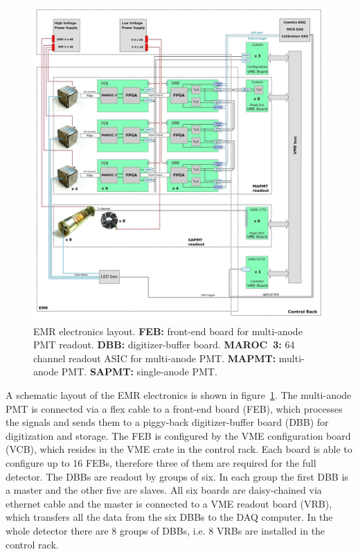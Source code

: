 \documentclass[a4paper,11pt]{article}
\begin{document}
\begin{figure}[htp!]
 \centering
 \includegraphics[width=\textwidth]{./EMR_electronics_layout}
 \caption[EMR electronics layout.]{EMR electronics layout. {\bf FEB:} front-end board for multi-anode PMT readout. {\bf DBB:} digitizer-buffer
 board. {\bf MAROC~3:} 64 channel readout ASIC for multi-anode PMT. {\bf MAPMT:} multi-anode PMT. {\bf SAPMT:} single-anode PMT.}
 \label{fig:EMR_electronics_layout}
\end{figure}

A schematic layout of the EMR electronics is shown in figure~\ref{fig:EMR_electronics_layout}. The multi-anode PMT is connected via a flex cable
to a front-end board (FEB), which processes the signals and sends them to a piggy-back digitizer-buffer board (DBB) for digitization and storage.
The FEB is configured by the VME configuration board (VCB), which resides in the VME crate in the control rack. Each board is able to configure
up to 16 FEBs, therefore three of them are required for the full detector. The DBBs are readout by groups of six. In each group the first DBB
is a master and the other five are slaves. All six boards are daisy-chained via ethernet cable and the master is connected to a VME readout board
(VRB), which transfers all the data from the six DBBs to the DAQ computer. In the whole detector there are 8 groups of DBBs, i.e. 8 VRBs are
installed in the control rack. 
\end{document}

